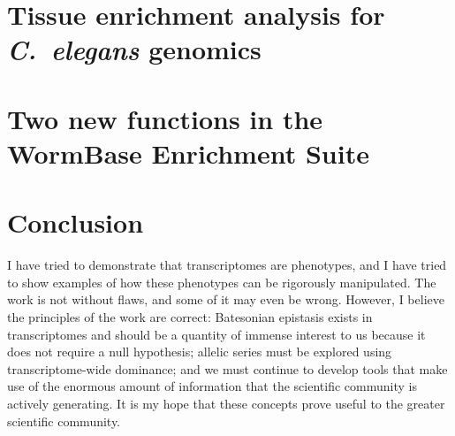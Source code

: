 \documentclass[12pt]{caltech_thesis}
\newcommand{\cel}{\emph{C.~elegans}}
\begin{document}
\chapter{Tissue enrichment analysis for \cel{} genomics}
\begin{refsection}
  
  \printbibliography[heading=subbibliography]
\end{refsection}

\chapter{Two new functions in the WormBase Enrichment Suite}
\begin{refsection}
  
  \printbibliography[heading=subbibliography]
\end{refsection}


\chapter*{Conclusion}

I have tried to demonstrate that transcriptomes are phenotypes, and I have tried
to show examples of how these phenotypes can be rigorously manipulated. The work
is not without flaws, and some of it may even be wrong. However, I believe the
principles of the work are correct: Batesonian epistasis exists in
transcriptomes and should be a quantity of immense interest to us because it
does not require a null hypothesis; allelic series must be explored using
transcriptome-wide dominance; and we must continue to develop tools that make
use of the enormous amount of information that the scientific community is
actively generating. It is my hope that these concepts prove useful to the
greater scientific community.



\printindex

\end{document}
